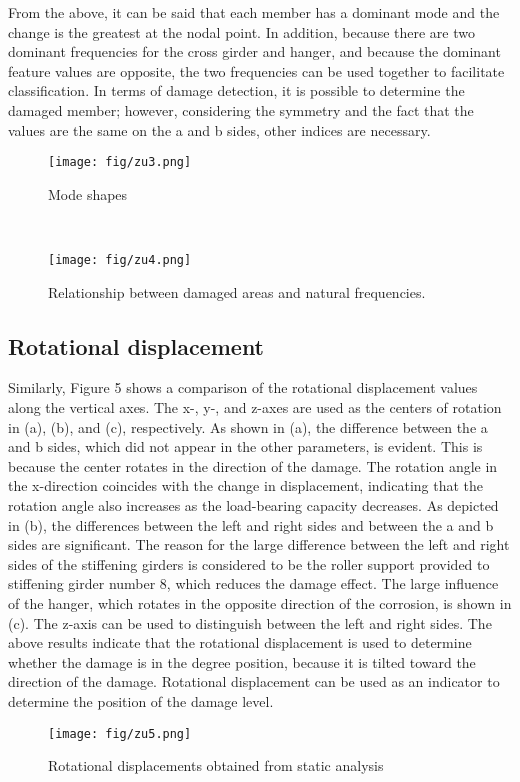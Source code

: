 \documentclass{proc-a4}
\begin{document}
From the above, it can be said that each member has a dominant mode and the change is the greatest at the nodal point. In addition, because there are two dominant frequencies for the cross girder and hanger, and because the dominant feature values are opposite, the two frequencies can be used together to facilitate classification. In terms of damage detection, it is possible to determine the damaged member; however, considering the symmetry and the fact that the values are the same on the a and b sides, other indices are necessary.
 \begin{figure}
            \centering
            \texttt{[image: fig/zu3.png]}
            \vspace*{-12pt}
            \caption{Mode shapes}
    \end{figure} \\
     \begin{figure}
            \centering
            \texttt{[image: fig/zu4.png]}
            \vspace*{-18pt}
            \caption{Relationship between damaged areas and natural frequencies.}
    \end{figure} 
\subsection{Rotational displacement}
Similarly, Figure 5 shows a comparison of the rotational displacement values along the vertical axes. The x-, y-, and z-axes are used as the centers of rotation in (a), (b), and (c), respectively. As shown in (a), the difference between the a and b sides, which did not appear in the other parameters, is evident. This is because the center rotates in the direction of the damage. The rotation angle in the x-direction coincides with the change in displacement, indicating that the rotation angle also increases as the load-bearing capacity decreases. As depicted in (b), the differences between the left and right sides and between the a and b sides are significant. The reason for the large difference between the left and right sides of the stiffening girders is considered to be the roller support provided to stiffening girder number 8, which reduces the damage effect. The large influence of the hanger, which rotates in the opposite direction of the corrosion, is shown in (c). The z-axis can be used to distinguish between the left and right sides. The above results indicate that the rotational displacement is used to determine whether the damage is in the degree position, because it is tilted toward the direction of the damage. Rotational displacement can be used as an indicator to determine the position of the damage level.
\begin{figure}
            \centering
            \texttt{[image: fig/zu5.png]}
            \caption{Rotational displacements obtained from static analysis}
    \end{figure} \\
\end{document}
